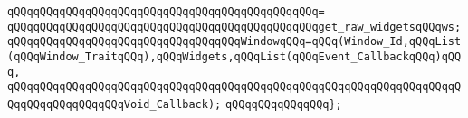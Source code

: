 \verb|qQQqqQQqqQQqqQQqqQQqqQQqqQQqqQQqqQQqqQQqqQQqqQQq=|\newline
\verb|qQQqqQQqqQQqqQQqqQQqqQQqqQQqqQQqqQQqqQQqqQQqqQQqget_raw_widgetsqQQqws;|\newline
\newline
\verb|qQQqqQQqqQQqqQQqqQQqqQQqqQQqqQQqqQQqWindowqQQq=qQQq(Window_Id,qQQqList(qQQqWindow_TraitqQQq),qQQqWidgets,qQQqList(qQQqEvent_CallbackqQQq)qQQq,|\newline
\verb|qQQqqQQqqQQqqQQqqQQqqQQqqQQqqQQqqQQqqQQqqQQqqQQqqQQqqQQqqQQqqQQqqQQqqQQqqQQqqQQqqQQqqQQqVoid_Callback);|\newline
\newline
\newline
\verb|qQQqqQQqqQQqqQQq};|\newline
\newline

